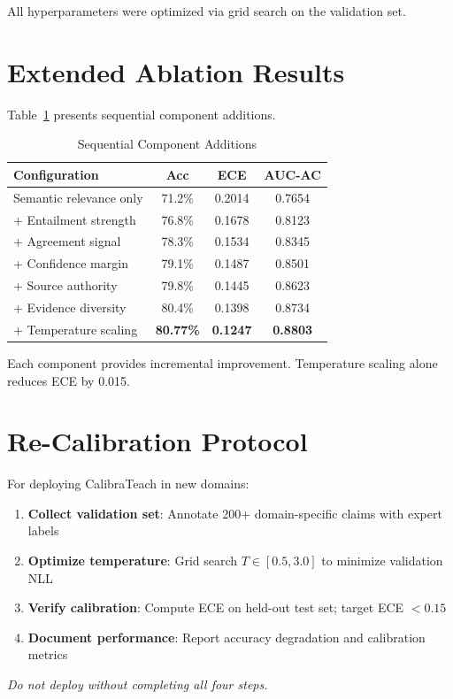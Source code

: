 \documentclass[journal]{IEEEtran}
\begin{document}
All hyperparameters were optimized via grid search on the validation set.

\section{Extended Ablation Results}

Table~\ref{tab:ablation_extended} presents sequential component additions.

\begin{table}[t]
\centering
\caption{Sequential Component Additions}
\label{tab:ablation_extended}
\begin{tabular}{lccc}
\toprule
\textbf{Configuration} & \textbf{Acc} & \textbf{ECE} & \textbf{AUC-AC} \\
\midrule
Semantic relevance only & 71.2\% & 0.2014 & 0.7654 \\
+ Entailment strength & 76.8\% & 0.1678 & 0.8123 \\
+ Agreement signal & 78.3\% & 0.1534 & 0.8345 \\
+ Confidence margin & 79.1\% & 0.1487 & 0.8501 \\
+ Source authority & 79.8\% & 0.1445 & 0.8623 \\
+ Evidence diversity & 80.4\% & 0.1398 & 0.8734 \\
+ Temperature scaling & \textbf{80.77\%} & \textbf{0.1247} & \textbf{0.8803} \\
\bottomrule
\end{tabular}
\end{table}

Each component provides incremental improvement. Temperature scaling alone reduces ECE by 0.015.

\section{Re-Calibration Protocol}

For deploying CalibraTeach in new domains:

\begin{enumerate}
    \item \textbf{Collect validation set}: Annotate 200+ domain-specific claims with expert labels
    \item \textbf{Optimize temperature}: Grid search $T \in [0.5, 3.0]$ to minimize validation NLL
    \item \textbf{Verify calibration}: Compute ECE on held-out test set; target ECE $<0.15$
    \item \textbf{Document performance}: Report accuracy degradation and calibration metrics
\end{enumerate}

\textit{Do not deploy without completing all four steps.}

\balance
\end{document}
